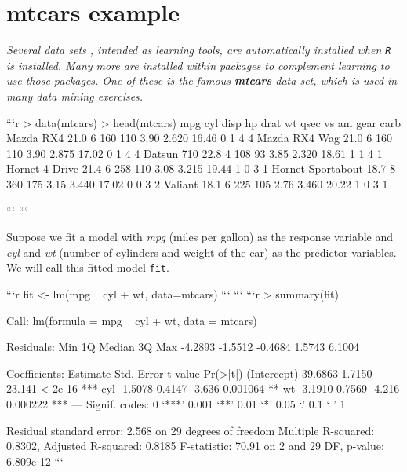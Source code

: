 

\Large	
\section{mtcars example} %

\textit{Several data sets , intended as learning tools, are automatically installed when \texttt{R} is installed. Many more are installed within packages to complement learning to use those packages. One of these is the famous \textbf{\textit{mtcars}} data set, which is used in many data mining exercises.}
{
	\large

```{r}
> data(mtcars)
> head(mtcars)
                   mpg cyl disp  hp drat    wt  qsec vs am gear carb
Mazda RX4         21.0   6  160 110 3.90 2.620 16.46  0  1    4    4
Mazda RX4 Wag     21.0   6  160 110 3.90 2.875 17.02  0  1    4    4
Datsun 710        22.8   4  108  93 3.85 2.320 18.61  1  1    4    1
Hornet 4 Drive    21.4   6  258 110 3.08 3.215 19.44  1  0    3    1
Hornet Sportabout 18.7   8  360 175 3.15 3.440 17.02  0  0    3    2
Valiant           18.1   6  225 105 2.76 3.460 20.22  1  0    3    1

```
```
}
\newpage
Suppose we fit a model with \textit{mpg} (miles per gallon) as the response variable and \textit{cyl} and \textit{wt} (number of cylinders and weight of the car)
as the predictor variables. We will call this fitted model \texttt{fit}.



```{r}
fit <- lm(mpg ~ cyl + wt, data=mtcars)
```
```
\newpage
```{r}
> summary(fit)

Call:
lm(formula = mpg ~ cyl + wt, data = mtcars)

Residuals:
Min      1Q  Median      3Q     Max 
-4.2893 -1.5512 -0.4684  1.5743  6.1004 

Coefficients:
Estimate Std. Error t value Pr(>|t|)    
(Intercept)  39.6863     1.7150  23.141  < 2e-16 ***
cyl          -1.5078     0.4147  -3.636 0.001064 ** 
wt           -3.1910     0.7569  -4.216 0.000222 ***
---
Signif. codes:  0 ‘***’ 0.001 ‘**’ 0.01 ‘*’ 0.05 ‘.’ 0.1 ‘ ’ 1

Residual standard error: 2.568 on 29 degrees of freedom
Multiple R-squared:  0.8302,    Adjusted R-squared:  0.8185 
F-statistic: 70.91 on 2 and 29 DF,  p-value: 6.809e-12
```
\newpage


